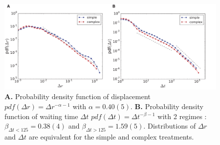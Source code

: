 \begin{figure}[h!]
\begin{center}
\includegraphics[width=17cm]{figures/pdfs.pdf}
\caption{{\bf A.} Probability density function of displacement $pdf(\Delta r) = \Delta r^{-\alpha -1}$ with $\alpha = 0.40(5)$. {\bf B.} Probability density function of waiting time $\Delta t$ $pdf(\Delta t) = \Delta t^{-\beta -1}$ with 2 regimes : $\beta_{\Delta t < 125} = 0.38(4)$ and $\beta_{\Delta t > 125} = 1.59(5)$. Distributions of $\Delta r$ and $\Delta t$ are equivalent for the simple and complex treatments.}
\label{fig:pdfs}
\end{center}
\end{figure}





